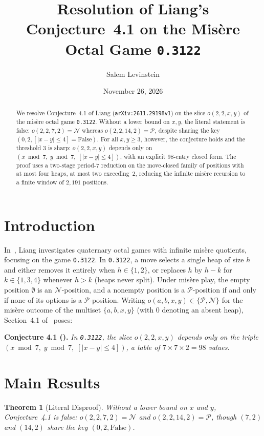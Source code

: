\documentclass[11pt]{article}
\title{Resolution of Liang's Conjecture~4.1 on the Mis\`{e}re Octal Game \texttt{0.3122}}
\author{Salem Levinstein}
\date{November 26, 2026}
\newtheorem{theorem}{Theorem}
\begin{document}
\maketitle

\begin{abstract}
We resolve Conjecture~4.1 of Liang (\texttt{arXiv:2611.29198v1}) on the slice $o(2,2,x,y)$ of the mis\`{e}re octal game \texttt{0.3122}. Without a lower bound on $x,y$, the literal statement is false: $o(2,2,7,2) = \mathcal{N}$ whereas $o(2,2,14,2) = \mathcal{P}$, despite sharing the key $(0, 2, [|x-y| \le 4] = \mathrm{False})$. For all $x, y \ge 3$, however, the conjecture holds and the threshold $3$ is sharp: $o(2,2,x,y)$ depends only on $(x \bmod 7,\; y \bmod 7,\; [|x-y| \le 4])$, with an explicit $98$-entry closed form. The proof uses a two-stage period-$7$ reduction on the move-closed family of positions with at most four heaps, at most two exceeding~$2$, reducing the infinite mis\`{e}re recursion to a finite window of $2{,}191$ positions.
\end{abstract}

\section{Introduction}
In~\cite{Liang2026}, Liang investigates quaternary octal games with infinite mis\`{e}re quotients, focusing on the game \texttt{0.3122}. In \texttt{0.3122}, a move selects a single heap of size $h$ and either removes it entirely when $h \in \{1, 2\}$, or replaces $h$ by $h - k$ for $k \in \{1, 3, 4\}$ whenever $h > k$ (heaps never split). Under mis\`{e}re play, the empty position $\emptyset$ is an $\mathcal{N}$-position, and a nonempty position is a $\mathcal{P}$-position if and only if none of its options is a $\mathcal{P}$-position. Writing $o(a,b,x,y) \in \{\mathcal{P},\mathcal{N}\}$ for the mis\`{e}re outcome of the multiset $\{a,b,x,y\}$ (with $0$ denoting an absent heap), Section~4.1 of~\cite{Liang2026} poses:

\medskip
\noindent\textbf{Conjecture 4.1 (\cite{Liang2026}).} \emph{In \texttt{0.3122}, the slice $o(2,2,x,y)$ depends only on the triple $(x \bmod 7,\; y \bmod 7,\; [|x-y| \le 4])$, a table of $7 \times 7 \times 2 = 98$ values.}
\medskip

\section{Main Results}

\begin{theorem}[Literal Disproof]\label{thm:disproof}
Without a lower bound on $x$ and $y$, Conjecture~4.1 is false: $o(2, 2, 7, 2) = \mathcal{N}$ and $o(2, 2, 14, 2) = \mathcal{P}$, though $(7, 2)$ and $(14, 2)$ share the key $(0, 2, \mathrm{False})$.
\end{theorem}
\end{document}
